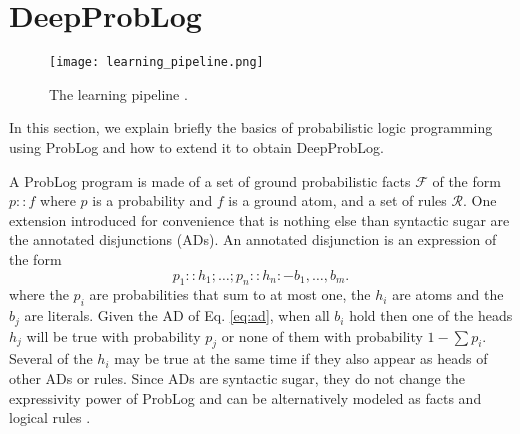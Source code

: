 \section{DeepProbLog}
\label{sec:DeepProbLog}

\begin{figure*}[ht]
\centerline{\texttt{[image: learning\_pipeline.png]}}
\caption{The learning pipeline \cite{ProbLog}.}
\label{fig:learning_pipeline}
\end{figure*}


In this section, we explain briefly the basics of probabilistic logic programming using ProbLog and how to extend it to obtain DeepProbLog.

A ProbLog program is made of a set of ground probabilistic facts $\mathcal{F}$ of the form $p :: f$ where $p$ is a probability and $f$ is a ground atom, and a set of rules $\mathcal{R}$.
One extension introduced for convenience that is nothing else than syntactic sugar are the annotated disjunctions (ADs). An annotated disjunction is an expression of the form 
\begin{equation}
\label{eq:ad}
    p_1 :: h_1 ; \dots ; p_n :: h_n {:-} b_1, \dots, b_m.
\end{equation}
where the $p_i$ are probabilities that sum to at most one, the $h_i$ are atoms and the $b_j$ are literals. Given the AD of Eq. \ref{eq:ad}, when all $b_i$ hold then one of the heads $h_j$ will be true with probability $p_j$ or none of them with probability $1 - \sum{p_i}$. Several of the $h_i$ may be true at the same time if they also appear as heads of other ADs or rules. Since ADs are syntactic sugar, they do not change the expressivity power of ProbLog and can be alternatively modeled as facts and logical rules \cite{DeRaedt2015}.




